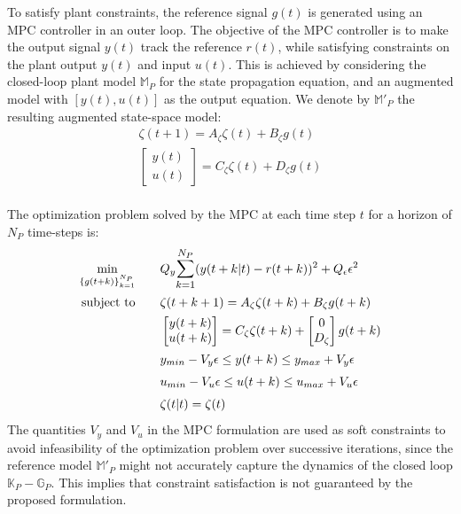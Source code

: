 \documentclass[letterpaper, 10 pt, conference]{ieeeconf}  %
\begin{document}
	To satisfy plant constraints, the reference signal $g(t)$ is generated using an MPC controller in an outer loop. The objective of the MPC controller is to make the output signal $y(t)$ track the reference $r(t)$, while satisfying constraints on the plant output $y(t)$ and input $u(t)$. This is achieved by considering the closed-loop plant model $\mathbb{M}_P$ for the state propagation equation, and an augmented model with $[y(t),u(t)]$ as the output equation. We denote by $\mathbb{M}'_P$ the resulting augmented state-space model:
	\begin{equation*}
	\begin{matrix}
	\zeta(t+1) = A_\zeta\zeta(t) + B_\zeta g(t)\\
	\begin{bmatrix}y(t)\\u(t)\end{bmatrix} = C_\zeta\zeta(t) + D_\zeta g(t)
	\end{matrix}
	\end{equation*}
	\\
	The optimization problem solved by the MPC at each time step $t$ for a horizon of $N_P$ time-steps is:
	\begin{equation}
	\small
	\begin{aligned}
	 \underset{\{g(t+k)\}_{k=1}^{N_P}}{\text{min}}
	& \hspace{20pt} Q_y\mathlarger{\sum\limits_{k=1}^{N_P}}(y(t+k|t)-r(t+k))^2 + Q_{\epsilon}\epsilon^2 \\
	 \text{subject to}
	&   \hspace{20pt}
	\zeta(t+k+1) = A_\zeta\zeta(t+k) + B_\zeta g(t+k)\\
	& \hspace{20pt} \begin{bmatrix}y(t+k)\\u(t+k)\end{bmatrix} = C_\zeta\zeta(t+k) +  \begin{bmatrix}0\\D_\zeta\end{bmatrix}g(t+k)\\
	& \hspace{20pt}  y_{min}-V_y\epsilon \leq y(t+k) \leq  y_{max}+V_y\epsilon \\
	& \hspace{20pt}  u_{min}-V_u\epsilon \leq u(t+k) \leq u_{max}+V_u\epsilon \\
	& \hspace{20pt}  \zeta(t|t) = \zeta(t)
	\end{aligned}
	\label{MPC}
	\end{equation}
	\normalsize
	The quantities $V_y$ and $V_u$ in the MPC formulation are used as soft constraints to avoid infeasibility of the optimization problem over successive iterations, since the reference model $\mathbb{M}'_P$ might not accurately capture the dynamics of the closed loop $\mathbb{K}_P-\mathbb{G}_P$. This implies that constraint satisfaction is not guaranteed by the proposed formulation. 
	
\end{document}
